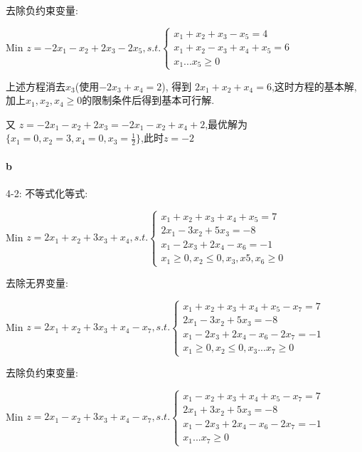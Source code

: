 \documentclass[a4paper]{article}
\begin{document}
去除负约束变量:

Min \(z=-2x_1-x_2+2x_3-2x_5 , s.t. \left\{\begin{aligned}
  x_1+x_2+x_3-x_5=4 \\
  x_1+x_2-x_3+x_4+x_5=6 \\
x_1  ... x_5 \geq 0
\end{aligned}\right.\)


上述方程消去$x_3$(使用$-2x_3 + x_4 = 2$), 得到 $2x_1 + x_2 + x_4 = 6$,这时方程的基本解,加上$x_1,x_2,x_4 \geq 0$的限制条件后得到基本可行解.

又 $z = -2x_1 - x_2 + 2x_3 = -2x_1 - x_2 + x_4 + 2$,最优解为\(\{x_1 = 0,x_2 = 3,x_4 = 0,x_3 = \frac{1}{2}\}\),此时$z=-2$
\paragraph{b}


4-2:
不等式化等式:

Min \(z=2x_1+x_2+3x_3+x_4 , s.t. \left\{\begin{aligned}
  x_1+x_2+x_3+x_4+x_5=7 \\
  2x_1-3x_2+5x_3=-8 \\
  x_1-2x_3+2x_4-x_6=-1 \\
x_1 \geq 0,x_2 \leq 0,x_3 , x5 ,x_6 \geq 0
\end{aligned}\right.\)

去除无界变量:

Min \(z=2x_1+x_2+3x_3+x_4-x_7 , s.t. \left\{\begin{aligned}
  x_1+x_2+x_3+x_4+x_5-x_7=7 \\
  2x_1-3x_2+5x_3=-8 \\
  x_1-2x_3+2x_4-x_6-2x_7=-1 \\
x_1 \geq 0,x_2 \leq 0,x_3...x_7 \geq 0
\end{aligned}\right.\)

去除负约束变量:

Min \(z=2x_1-x_2+3x_3+x_4-x_7 , s.t. \left\{\begin{aligned}
  x_1-x_2+x_3+x_4+x_5-x_7=7 \\
  2x_1+3x_2+5x_3=-8 \\
  x_1-2x_3+2x_4-x_6-2x_7=-1 \\
x_1 ... x_7 \geq 0
\end{aligned}\right.\)


\section{}
\end{document}
